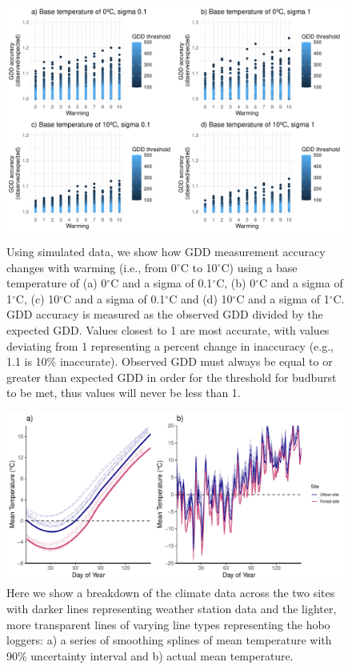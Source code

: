\documentclass{article}\usepackage[]{graphicx}\usepackage[]{color}
\begin{document}
\begin{figure}[H]
    \centering
    \includegraphics[height=8cm, width=12cm]{..//analyses/figures/gddratio_warming.pdf}
\caption{Using simulated data, we show how GDD measurement accuracy changes with warming (i.e., from 0$^{\circ}$C to 10$^{\circ}$C) using a base temperature of (a) 0$^{\circ}$C and a sigma of 0.1$^{\circ}$C, (b) 0$^{\circ}$C and a sigma of 1$^{\circ}$C, (c) 10$^{\circ}$C and a sigma of 0.1$^{\circ}$C and (d) 10$^{\circ}$C and a sigma of 1$^{\circ}$C. GDD accuracy is measured as the observed GDD divided by the expected GDD. Values closest to 1 are most accurate, with values deviating from 1 representing a percent change in inaccuracy (e.g., 1.1 is 10\% inaccurate). Observed GDD must always be equal to or greater than expected GDD in order for the threshold for budburst to be met, thus values will never be less than 1.}
\label{fig:warming}
\end{figure}


{\begin{figure} [H]
  \begin{center}
  \includegraphics[width=12cm]{..//analyses/figures/climate_smoothdaily.pdf}
  \caption{Here we show a breakdown of the climate data across the two sites with darker lines representing weather station data and the lighter, more transparent lines of varying line types representing the hobo loggers: a) a series of smoothing splines of mean temperature with 90\% uncertainty interval and b) actual mean temperature.}\label{fig:clim}
  \end{center}
  \end{figure}}
  
\end{document}

